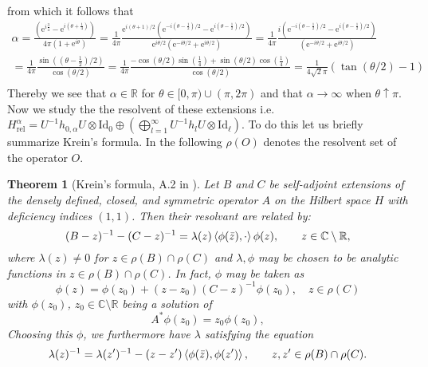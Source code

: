 \documentclass[a4paper,11pt]{article}
\newcommand{\euler}[1]{\text{e}^{#1}}
\newcommand{\R}{\mathbb{R}}
\newcommand{\C}{\mathbb{C}}
\newtheorem{theorem}{Theorem}
\numberwithin{equation}{section}
\begin{document}
from which it follows that \begin{equation}
\begin{aligned}
\alpha=\frac{(\euler{i\frac{3}{4}}-\euler{i(\theta+\frac{1}{4})})}{4\pi(1+\euler{i\theta})}=\frac{1}{4\pi}\frac{\euler{i(\theta+1)/2}(\euler{-i(\theta-\frac{1}{2})/2}-\euler{i(\theta-\frac{1}{2})/2})}{\euler{i\theta/2}(\euler{-i\theta/2}+\euler{i\theta/2})}=\frac{1}{4\pi}\frac{i(\euler{-i(\theta-\frac{1}{2})/2}-\euler{i(\theta-\frac{1}{2})/2})}{(\euler{-i\theta/2}+\euler{i\theta/2})}\\=\frac{1}{4\pi}\frac{\sin((\theta-\frac{1}{2})/2)}{\cos(\theta/2)}=\frac{1}{4\pi}\frac{-\cos(\theta/2)\sin(\frac{1}{4})+\sin(\theta/2)\cos(\frac{1}{4})}{\cos(\theta/2)}=\frac{1}{4\sqrt{2}\pi}\left(\tan(\theta/2)-1\right)\\
\end{aligned}
\end{equation}
Thereby we see that $ \alpha\in \R $ for $ \theta\in[0,\pi)\cup(\pi,2\pi) $ and that $ \alpha\to\infty $ when $ \theta\uparrow\pi $. Now we study the the resolvent of these extensions i.e. $ H_{\text{rel}}^{\alpha}=U^{-1}h_{0,\alpha}U\otimes\text{Id}_{0}\oplus\left(\bigoplus_{l=1}^{\infty}U^{-1}h_lU\otimes\text{Id}_{\ell} \right) $. To do this let us briefly summarize Krein's formula. In the following $ \rho(O) $ denotes the resolvent set of the operator $ O $.
\begin{theorem}[Krein's formula, A.2 in \cite{albeverio2012solvable}]
	\label{Krein's formula}
	Let $ B $ and $ C $ be self-adjoint extensions of the densely defined, closed, and symmetric operator $ A $ on the Hilbert space $ H $ with deficiency indices $ (1,1) $. Then their resolvant are related by:\begin{equation}
	(B-z)^{-1}-(C-z)^{-1}=\lambda(z)\braket{\phi(\bar{z}),\cdot}\phi(z),\qquad z\in\C\setminus\R,
	\end{equation}
	where $ \lambda(z)\neq0 $ for $ z\in\rho(B)\cap\rho(C) $ and $\lambda, \phi $ may be  chosen to be analytic functions in $ z\in\rho(B)\cap\rho(C) $. In fact, $ \phi $ may be taken as \begin{equation}
	\label{phi relation}
	\phi(z)=\phi(z_0)+(z-z_0)(C-z)^{-1}\phi(z_0),\quad z\in \rho(C)
	\end{equation}
	with $ \phi(z_0) $, $ z_0\in \C\setminus\R $ being a solution of \begin{equation}
	A^*\phi(z_0)=z_0\phi(z_0),
	\end{equation}
	Choosing this $ \phi $, we furthermore have $ \lambda $ satisfying the equation\begin{equation}
	\label{lambda relation}
	\lambda(z)^{-1}=\lambda(z')^{-1}-(z-z')\braket{\phi(\bar{z}),\phi(z')},\qquad z,z'\in\rho(B)\cap\rho(C).
	\end{equation}
\end{theorem}
\end{document}

